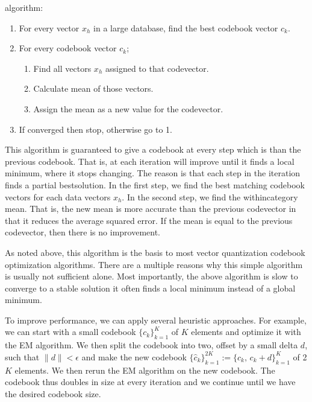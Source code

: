 \documentclass[letterpaper,10pt,english]{jupyterBook}
\begin{document}
\sphinxAtStartPar
{} algorithm:
\begin{enumerate}
%
\item {} 
\sphinxAtStartPar
For every vector \(x_{h}\) in a large database, find the best
codebook vector \(c_{k}\).

\item {} 
\sphinxAtStartPar
For every codebook vector \(c_{k}\);
\begin{enumerate}
%
\item {} 
\sphinxAtStartPar
Find all vectors \(x_{h}\) assigned to that codevector.

\item {} 
\sphinxAtStartPar
Calculate mean of those vectors.

\item {} 
\sphinxAtStartPar
Assign the mean as a new value for the codevector.

\end{enumerate}

\item {} 
\sphinxAtStartPar
If converged then stop, otherwise go to 1.

\end{enumerate}

\sphinxAtStartPar
This algorithm is guaranteed to give a codebook at every step which is
 than the previous codebook. That is, at each iteration will
improve until it finds a local minimum, where it stops changing. The
reason is that each step in the iteration finds a partial best\sphinxhyphen{}solution.
In the first step, we find the best matching codebook vectors for each
data vectors \(x_{h}\). In the second step, we find the
within\sphinxhyphen{}category mean. That is, the new mean is more accurate than the
previous codevector in that it reduces the average squared error. If the
mean is equal to the previous codevector, then there is no improvement.

\sphinxAtStartPar
As noted above, this algorithm is the basis to most vector quantization
codebook optimization algorithms. There are a multiple reasons why this
simple algorithm is usually not sufficient alone. Most importantly, the
above algorithm is slow to converge to a stable solution  it often
finds a local minimum instead of a global minimum.

\sphinxAtStartPar
To improve performance, we can apply several heuristic approaches. For
example, we can start with a small codebook \( \{ c_k \}_{k=1}^K \)
of \(K\) elements and optimize it with the EM algorithm. We then split the
codebook into two, offset by a small delta \(d\), such that \(
\|d\|<\epsilon \) and make the new codebook \( \{ \hat c_k
\}_{k=1}^{2K} := \{ c_k,\, c_k+d \}_{k=1}^K \) of 2\(K\) elements.
We then rerun the EM algorithm on the new codebook. The codebook thus
doubles in size at every iteration and we continue until we have the
desired codebook size.
\end{document}

